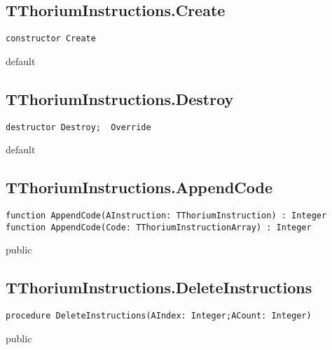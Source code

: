 \subsection{TThoriumInstructions.Create}
\label{thoriumcore:thorium:tthoriuminstructions:create}
\begin{FPCList}
\Synopsis
\Declaration 

\begin{verbatim}
constructor Create
\end{verbatim}
\Visibility
default
\Description
\Errors
\end{FPCList}
\subsection{TThoriumInstructions.Destroy}
\label{thoriumcore:thorium:tthoriuminstructions:destroy}
\begin{FPCList}
\Synopsis
\Declaration 

\begin{verbatim}
destructor Destroy;  Override
\end{verbatim}
\Visibility
default
\Description
\Errors
\end{FPCList}
\subsection{TThoriumInstructions.AppendCode}
\label{thoriumcore:thorium:tthoriuminstructions:appendcode}
\begin{FPCList}
\Synopsis
\Declaration 

\begin{verbatim}
function AppendCode(AInstruction: TThoriumInstruction) : Integer
function AppendCode(Code: TThoriumInstructionArray) : Integer
\end{verbatim}
\Visibility
public
\Description
\Errors
\end{FPCList}
\subsection{TThoriumInstructions.DeleteInstructions}
\label{thoriumcore:thorium:tthoriuminstructions:deleteinstructions}
\begin{FPCList}
\Synopsis
\Declaration 

\begin{verbatim}
procedure DeleteInstructions(AIndex: Integer;ACount: Integer)
\end{verbatim}
\Visibility
public
\Description
\Errors
\end{FPCList}

